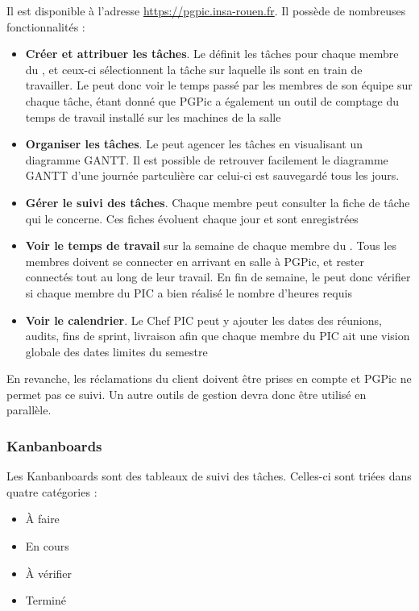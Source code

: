 Il est disponible à l’adresse \url{https://pgpic.insa-rouen.fr}. Il possède de nombreuses fonctionnalités : 
\begin{itemize}
\item \textbf{Créer et attribuer les tâches}. Le \CP définit les tâches pour chaque membre du \PICCourt, et ceux-ci sélectionnent la tâche sur laquelle ils sont en train de travailler. Le \CP peut donc voir le temps passé par les membres de son équipe sur chaque tâche, étant donné que PGPic a également un outil de comptage du temps de travail installé sur les machines de la salle \PICCourt
\item \textbf{Organiser les tâches}. Le \CP peut agencer les tâches en visualisant un diagramme GANTT. Il est possible de retrouver facilement le diagramme GANTT d'une journée partculière car celui-ci est sauvegardé tous les jours. 
\item \textbf{Gérer le suivi des tâches}. Chaque membre peut consulter la fiche de tâche qui le concerne. Ces fiches évoluent chaque jour et sont enregistrées
\item \textbf{Voir le temps de travail} sur la semaine de chaque membre du \PICCourt. Tous les membres doivent se connecter en arrivant en salle \PICCourt à PGPic, et rester connectés tout au long de leur travail. En fin de semaine, le \CP peut donc vérifier si chaque membre du PIC a bien réalisé le nombre d’heures requis
\item \textbf{Voir le calendrier}. Le Chef PIC peut y ajouter les dates des réunions, audits, fins de sprint, livraison afin que chaque membre du PIC ait une vision globale des dates limites du semestre \\ 
\end{itemize}

En revanche, les réclamations du client doivent être prises en compte et PGPic ne permet pas ce suivi. Un autre outils de gestion devra donc être utilisé en parallèle. 


\subsubsection*{Kanbanboards} 

Les Kanbanboards sont des tableaux de suivi des tâches. Celles-ci sont triées dans quatre catégories :
\begin{itemize}
\item \`A faire
\item En cours
\item \`A vérifier
\item Terminé \\ 
\end{itemize}

